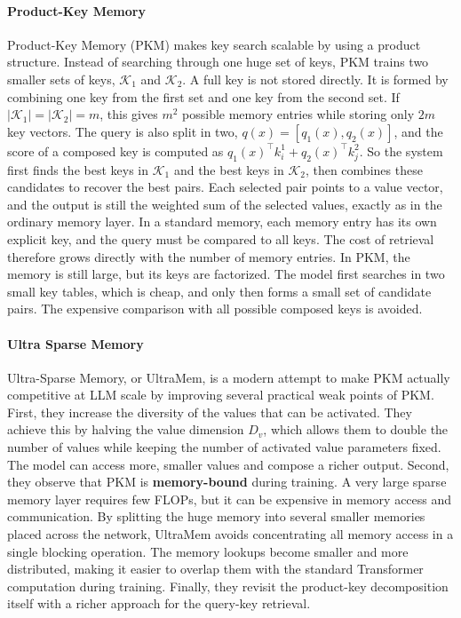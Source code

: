 \paragraph{Product-Key Memory}
Product-Key Memory (PKM) \citep{lample2019largememorylayersproduct} 
makes key search scalable by using a product structure.
Instead of searching through one huge set of keys, PKM trains two smaller sets of keys,
$\mathcal{K}_1$ and $\mathcal{K}_2$. A full key is not stored directly. It is
formed by combining one key from the first set and one key from the second set.
If $|\mathcal{K}_1|=|\mathcal{K}_2|=m$, this gives $m^2$ possible memory
entries while storing only $2m$ key vectors. The query is also split in two,
$q(x) = [q_1(x), q_2(x)]$, and the score of a composed key is computed as
$q_1(x)^\top k_i^1 + q_2(x)^\top k_j^2$. So the system first
finds the best keys in $\mathcal{K}_1$ and the best keys in $\mathcal{K}_2$,
then combines these candidates to recover the best pairs. Each selected pair
points to a value vector, and the output is still the weighted sum of the
selected values, exactly as in the ordinary memory layer.
In a standard memory, each memory entry has its own explicit key, 
and the query must be compared to all keys. The cost of retrieval therefore grows 
directly with the number of memory entries. 
In PKM, the memory is still large, but its keys are factorized.
The model first searches in two small key tables, which is cheap, and only then
forms a small set of candidate pairs. The expensive comparison with all possible
composed keys is avoided.

\paragraph{Ultra Sparse Memory}
Ultra-Sparse Memory, or UltraMem, is a modern attempt to make PKM
actually competitive at LLM scale \citep{huang2025ultrasparsememorynetwork}
by improving several practical weak points of PKM.
First, they increase the diversity of the values that can be activated. 
They achieve this by halving the value dimension $D_v$, which allows them to double the
number of values while keeping the number of activated value parameters
fixed. The model can access more, smaller values and compose a richer output.
Second, they observe that PKM is \textbf{memory-bound} during training. A very large
sparse memory layer requires few FLOPs, but it can be expensive in memory access and
communication. By splitting the huge memory into several smaller memories
placed across the network, UltraMem avoids concentrating all memory access 
in a single blocking operation. The memory lookups become smaller and more distributed, 
making it easier to overlap them with the standard Transformer computation during training.
Finally, they revisit the product-key decomposition itself with a richer approach
for the query-key retrieval.

